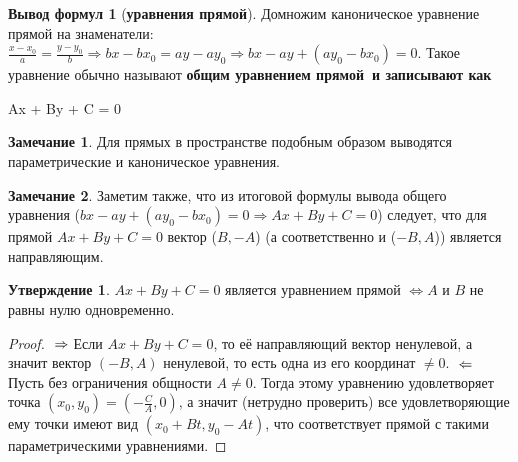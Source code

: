 \documentclass[a4paper, 12pt]{article}
\theoremstyle{definition}
\newtheorem*{subtheorem}{Утверждение}
\newtheorem*{formulas}{Вывод формул}
\newtheorem*{remark}{Замечание}
\newenvironment{boxedalign*}
  {\begin{equation*}\begin{lrbox}{\boxedalignbox}$\begin{aligned}}
  {\end{aligned}$\end{lrbox}\fbox{\usebox{\boxedalignbox}}\end{equation*}}
\begin{document}
\begin{formulas}[\bfseries уравнения прямой\mdseries]
		Домножим каноническое уравнение прямой на знаменатели: $\frac{x-x_{0}}{a} = \frac{y-y_{0}}{b} \Rightarrow bx-bx_{0}=ay-ay_{0} \Rightarrow bx - ay + (ay_{0}-bx_{0}) = 0$. Такое уравнение обычно называют \bfseries общим уравнением прямой\mdseries \ и записывают как \begin{boxedalign*}Ax + By + C = 0\end{boxedalign*}
	\end{formulas}
	\begin{remark}
		Для прямых в пространстве подобным образом выводятся параметрические и каноническое уравнения. 
	\end{remark}
	\begin{remark}
		Заметим также, что из итоговой формулы вывода общего уравнения ($bx - ay + (ay_{0}-bx_{0}) = 0 \Rightarrow Ax + By + C = 0$) следует, что для прямой $Ax + By +C = 0$ вектор ($B, -A$) (а соответственно и ($-B, A$)) является направляющим.
	\end{remark}
	\begin{subtheorem}
		$Ax + By + C = 0$ является уравнением прямой $\Leftrightarrow A$ и $B$ не равны нулю одновременно.
	\end{subtheorem}
	\begin{proof}
		$\\ \Rightarrow$ Если $Ax + By + C = 0$, то её направляющий вектор ненулевой, а значит вектор $(-B, A)$ ненулевой, то есть одна из его координат $\neq 0$.
		$\\ \Leftarrow$ Пусть без ограничения общности $A \neq 0$. Тогда этому уравнению удовлетворяет точка $(x_{0}, y_{0}) = (-\frac{C}{A}, 0)$, а значит (нетрудно проверить) все удовлетворяющие ему точки имеют вид $(x_{0} + Bt, y_{0} - At)$, что соответствует прямой с такими параметрическими уравнениями.
	\end{proof}
\end{document}
